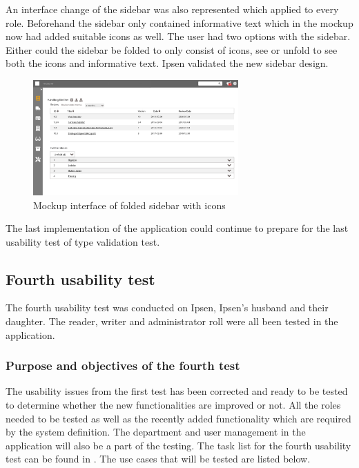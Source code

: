 An interface change of the sidebar was also represented which applied to every role.
Beforehand the sidebar only contained informative text which in the mockup now had added suitable icons as well.
The user had two options with the sidebar.
Either could the sidebar be folded to only consist of icons, see  or unfold to see both the icons and informative text.
Ipsen validated the new sidebar design.

\begin{figure}[H]
	\centering
		\includegraphics[width=0.7\textwidth]{billeder/ForsideFoldedSidebar.jpg}
	\caption{Mockup interface of folded sidebar with icons}\label{fig:mockupSidebarIcon}
\end{figure}

The last implementation of the application could continue to prepare for the last usability test of type validation test.

\subsection{Fourth usability test}\label{fourthtest}
The fourth usability test was conducted on Ipsen, Ipsen's husband and their daughter.
The reader, writer and administrator roll were all been tested in the application.

\subsubsection*{Purpose and objectives of the fourth test}
The usability issues from the first test has been corrected and ready to be tested to determine whether the new functionalities are improved or not.
All the roles needed to be tested as well as the recently added functionality which are required by the system definition.
The department and user management in the application will also be a part of the testing. The task list for the fourth usability test can be found in .
The use cases that will be tested are listed below.

